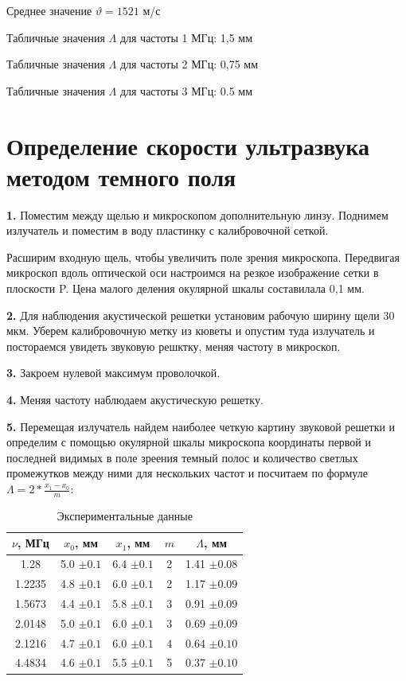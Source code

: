 \documentclass[a4paper]{article}
\begin{document}
Среднее значение $\vartheta = 1521$ м/с

Табличные значения $\Lambda$ для частоты 1 МГц: 1,5 мм \par
Табличные значения $\Lambda$ для частоты 2 МГц: 0,75 мм \par
Табличные значения $\Lambda$ для частоты 3 МГц: 0.5 мм \par

\section{Определение скорости ультразвука методом темного поля}

\textbf{1.} Поместим между щелью и микроскопом дополнительную линзу.
Поднимем излучатель и поместим в воду пластинку с калибровочной сеткой.\par

Расширим входную щель, чтобы увеличить поле зрения микроскопа. Передвигая микроскоп вдоль оптической оси настроимся на резкое изображение сетки в плоскости P. Цена малого деления окулярной шкалы составилала 0,1 мм.

\textbf{2.} Для наблюдения акустической решетки установим рабочую ширину щели 30 мкм. Уберем калибровочную метку из кюветы и опустим туда излучатель и постораемся увидеть звуковую решктку, меняя частоту в микроскоп.\par

\textbf{3.} Закроем нулевой максимум проволочкой.

\textbf{4.} Меняя частоту наблюдаем акустическую решетку.

\textbf{5.} Перемещая излучатель найдем наиболее четкую картину звуковой решетки и определим с помощью окулярной шкалы микроскопа координаты первой и последней видимых в поле зреения темный полос и количество светлых промежутков между ними для нескольких частот и посчитаем по формуле $\Lambda = 2* \frac{x_1-x_0}{m}$:

\begin{table}[htbp]
  \centering
  \caption{Экспериментальные данные}
  \begin{tabular}{|c|c|c|c|c|}
    \hline
    \(\nu\), МГц & \(x_0\), мм & \(x_1\), мм & \(m\) & \(\Lambda\), мм \\
    \hline
    1.28 & 5.0 $\pm 0.1$ & 6.4 $\pm 0.1$ & 2 & 1.41 $\pm 0.08$ \\
    \hline
    1.2235 & 4.8 $\pm 0.1$ & 6.0 $\pm 0.1$ & 2 & 1.17 $\pm 0.09$\\
    \hline
    1.5673 & 4.4 $\pm 0.1$ & 5.8 $\pm 0.1$ & 3 & 0.91 $\pm 0.09$ \\
    \hline
    2.0148 & 5.0 $\pm 0.1$ & 6.0 $\pm 0.1$ & 3 & 0.69 $\pm 0.09$ \\
    \hline
    2.1216 & 4.7 $\pm 0.1$ & 6.0 $\pm 0.1$ & 4 & 0.64 $\pm 0.10$ \\
    \hline
    4.4834 & 4.6 $\pm 0.1$ & 5.5 $\pm 0.1$ & 5 & 0.37 $\pm 0.10$\\
    \hline
  \end{tabular}
\end{table}
\end{document}
